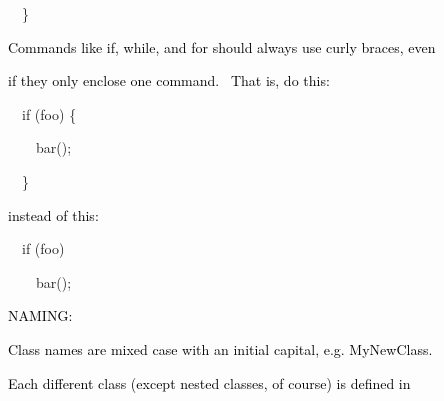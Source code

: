 \documentclass[a4paper]{article}
\newcommand\textstyleOOoComputerKeyWord[1]{\textrm{\textcolor[rgb]{0.0,0.0,0.5019608}{#1}}}
\newcommand\textstyleOOoComputerIdent[1]{\textrm{\textcolor[rgb]{0.0,0.5019608,0.0}{#1}}}
\begin{document}
{\color{black}
\textstyleOOoComputerKeyWord{\textcolor{black}{\ \ }}\textstyleOOoComputerKeyWord{\}}}

\clearpage
\bigskip


\bigskip

{\color{black}
\textstyleOOoComputerKeyWord{\textcolor{black}{Commands like if, while, and for should always use curly braces, even}}}

{\color{black}
\textstyleOOoComputerKeyWord{\textcolor{black}{if they only enclose one command. \ That is, do this:}}}


\bigskip

{\color{black}
\textstyleOOoComputerKeyWord{\textcolor{black}{\ \ }}\textstyleOOoComputerKeyWord{if}\textstyleOOoComputerKeyWord{\textcolor{black}{
}}\textstyleOOoComputerKeyWord{(}\textstyleOOoComputerIdent{foo}\textstyleOOoComputerKeyWord{)}\textstyleOOoComputerKeyWord{\textcolor{black}{
}}\textstyleOOoComputerKeyWord{\{}}

{\color{black}
\textstyleOOoComputerKeyWord{\textcolor{black}{\ \ \ \ }}\textstyleOOoComputerIdent{bar}\textstyleOOoComputerKeyWord{();}}

{\color{black}
\textstyleOOoComputerKeyWord{\textcolor{black}{\ \ }}\textstyleOOoComputerKeyWord{\}}}


\bigskip

{\color{black}
\textstyleOOoComputerKeyWord{\textcolor{black}{instead of this:}}}


\bigskip

{\color{black}
\textstyleOOoComputerKeyWord{\textcolor{black}{\ \ }}\textstyleOOoComputerKeyWord{if}\textstyleOOoComputerKeyWord{\textcolor{black}{
}}\textstyleOOoComputerKeyWord{(}\textstyleOOoComputerIdent{foo}\textstyleOOoComputerKeyWord{)}}

{\color{black}
\textstyleOOoComputerKeyWord{\textcolor{black}{\ \ \ \ }}\textstyleOOoComputerIdent{bar}\textstyleOOoComputerKeyWord{();}}


\bigskip


\bigskip

{\color{black}
\textstyleOOoComputerKeyWord{\textcolor{black}{NAMING:}}}


\bigskip

{\color{black}
\textstyleOOoComputerKeyWord{\textcolor{black}{Class names are mixed case with an initial capital, e.g. MyNewClass.}}}

{\color{black}
\textstyleOOoComputerKeyWord{\textcolor{black}{Each different class (except nested classes, of course) is defined in}}}
\end{document}
